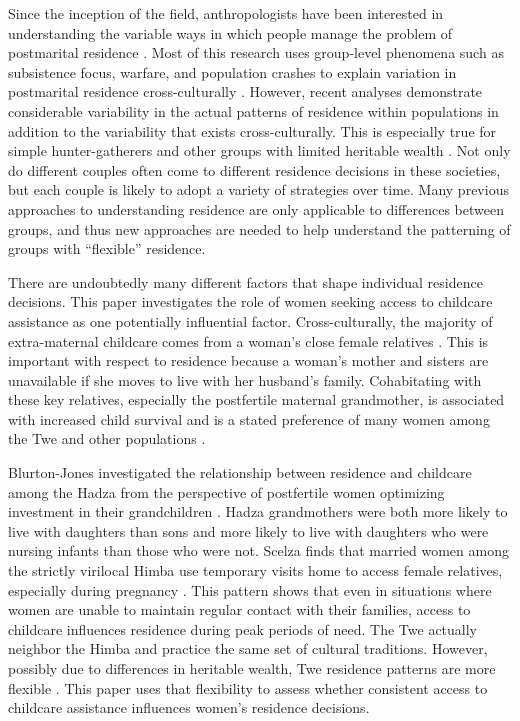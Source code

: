 \documentclass[10pt]{article}
\begin{document}
Since the inception of the field, anthropologists have been interested in understanding the variable ways in which people manage the problem of postmarital residence \citep{morgan1851league, tylor1889method}.  Most of this research uses group-level phenomena such as subsistence focus, warfare, and population crashes to explain variation in postmarital residence cross-culturally \citep{lippert1931evolution, murdock1949social, korotayev2003division, linton1964study, ember1971conditions, divale1974migration, elman1962primitive, ember1972conditions}.  However, recent analyses demonstrate considerable variability in the actual patterns of residence within populations in addition to the variability that exists cross-culturally.  This is especially true for simple hunter-gatherers and other groups with limited heritable wealth \citep{lee1972kung, devore1968man, alvarez2004residence, marlowe2004marital, hill2011co, walker2013living}.  Not only do different couples often come to different residence decisions in these societies, but each couple is likely to adopt a variety of strategies over time.  Many previous approaches to understanding residence are only applicable to differences between groups, and thus new approaches are needed to help understand the patterning of groups with ``flexible'' residence.  

There are undoubtedly many different factors that shape individual residence decisions.  This paper investigates the role of women seeking access to childcare assistance as one potentially influential factor.  Cross-culturally, the majority of extra-maternal childcare comes from a woman's close female relatives \citep{euler1996discriminative, hawkes1997hadza, ivey2000cooperative, sear2000maternal, voland2002opposite}.  This is important with respect to residence because a woman's mother and sisters are unavailable if she moves to live with her husband's family.  Cohabitating with these key relatives, especially the postfertile maternal grandmother, is associated with increased child survival and is a stated preference of many women among the Twe and other populations \citep{sear2008keeps, woodburn1968stability, meehan2005effects}.  

Blurton-Jones investigated the relationship between residence and childcare among the Hadza from the perspective of postfertile women optimizing investment in their grandchildren \citep{jones2005hadza}.   Hadza grandmothers were both more likely to live with daughters than sons and more likely to live with daughters who were nursing infants than those who were not.  Scelza finds that married women among the strictly virilocal Himba use temporary visits home to access female relatives, especially during pregnancy \citep{scelza2011female}.  This pattern shows that even in situations where women are unable to maintain regular contact with their families, access to childcare influences residence during peak periods of need.  The Twe actually neighbor the Himba and practice the same set of cultural traditions.  However, possibly due to differences in heritable wealth, Twe residence patterns are more flexible \citep{vashro2014diss}.  This paper uses that flexibility to assess whether consistent access to childcare assistance influences women's residence decisions.
\end{document}
